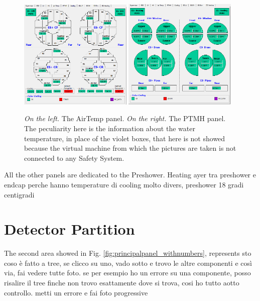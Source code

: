 \documentclass[12pt]{article}
\begin{document}
\begin{figure}[!h]
	\centering
	\includegraphics[width=0.48\textwidth]{Pics/ESEnv.png}
	\quad 
	\includegraphics[width=0.48\textwidth]{Pics/ESHeat.png}
	\caption{\textit{On the left.} The AirTemp panel. \textit{On the right.} The PTMH panel. The peculiarity here is the information about the water temperature, in place of the violet boxes, that here is not showed because the virtual machine from which the pictures are taken is not connected to any Safety System.}
	\label{fig:AirPTHM}
\end{figure}
All the other panels are dedicated to the Preshower.
Heating ayer tra preshower e endcap perche hanno temperature di cooling molto divers, preshower 18 gradi centigradi
\section{Detector Partition}
The second area showed in Fig. \ref{fig:principalpanel_withnumbers}, represents 
sto coso è fatto a tree, se clicco su uno, vado sotto e trovo le altre componenti e così via, fai vedere tutte foto.
se per esempio ho un errore su una componente, posso risalire il tree finche non trovo esattamente dove si trova, cosi ho tutto aotto controllo. 
metti un errore e fai foto progressive
\end{document}
